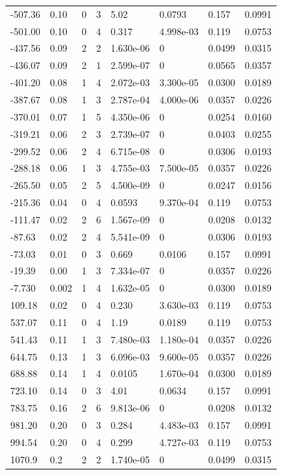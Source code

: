 \documentclass[preview]{standalone}
\begin{document}
{{\begin{tabular}{L{1.2cm}C{1.2cm} C{0.3cm}C{0.5cm} C{1.4cm}C{1.4cm} C{1.4cm}C{1.4cm}}
  -507.36  &  0.10  & 0     &  3 &  5.02  & 0.0793  & 0.157 &  0.0991   \\ 
  -501.00  &  0.10  & 0     &  4 &  0.317  & 4.998e-03  & 0.119 &  0.0753   \\ 
  -437.56  &  0.09  & 2     &  2 &  1.630e-06  & 0  & 0.0499 &  0.0315   \\ 
  -436.07  &  0.09  & 2     &  1 &  2.599e-07  & 0  & 0.0565 &  0.0357   \\ 
  -401.20  &  0.08  & 1     &  4 &  2.072e-03  & 3.300e-05  & 0.0300 &  0.0189   \\ 
  -387.67  &  0.08  & 1     &  3 &  2.787e-04  & 4.000e-06  & 0.0357 &  0.0226   \\ 
  -370.01  &  0.07  & 1     &  5 &  4.350e-06  & 0  & 0.0254 &  0.0160   \\ 
  -319.21  &  0.06  & 2     &  3 &  2.739e-07  & 0  & 0.0403 &  0.0255   \\ 
  -299.52  &  0.06  & 2     &  4 &  6.715e-08  & 0  & 0.0306 &  0.0193   \\ 
  -288.18  &  0.06  & 1     &  3 &  4.755e-03  & 7.500e-05  & 0.0357 &  0.0226   \\ 
  -265.50  &  0.05  & 2     &  5 &  4.500e-09  & 0  & 0.0247 &  0.0156   \\ 
  -215.36  &  0.04  & 0     &  4 &  0.0593  & 9.370e-04  & 0.119 &  0.0753   \\ 
  -111.47  &  0.02  & 2     &  6 &  1.567e-09  & 0  & 0.0208 &  0.0132   \\ 
  -87.63  &  0.02  & 2     &  4 &  5.541e-09  & 0  & 0.0306 &  0.0193   \\ 
  -73.03  &  0.01  & 0     &  3 &  0.669  & 0.0106  & 0.157 &  0.0991   \\ 
  -19.39  &  0.00  & 1     &  3 &  7.334e-07  & 0  & 0.0357 &  0.0226   \\ 
  -7.730  &  0.002  & 1     &  4 &  1.632e-05  & 0  & 0.0300 &  0.0189   \\ 
  109.18  &  0.02  & 0     &  4 &  0.230  & 3.630e-03  & 0.119 &  0.0753   \\ 
  537.07  &  0.11  & 0     &  4 &  1.19  & 0.0189  & 0.119 &  0.0753   \\ 
  541.43  &  0.11  & 1     &  3 &  7.480e-03  & 1.180e-04  & 0.0357 &  0.0226   \\ 
  644.75  &  0.13  & 1     &  3 &  6.096e-03  & 9.600e-05  & 0.0357 &  0.0226   \\ 
  688.88  &  0.14  & 1     &  4 &  0.0105  & 1.670e-04  & 0.0300 &  0.0189   \\ 
  723.10  &  0.14  & 0     &  3 &  4.01  & 0.0634  & 0.157 &  0.0991   \\ 
  783.75  &  0.16  & 2     &  6 &  9.813e-06  & 0  & 0.0208 &  0.0132   \\ 
  981.20  &  0.20  & 0     &  3 &  0.284  & 4.483e-03  & 0.157 &  0.0991   \\ 
  994.54  &  0.20  & 0     &  4 &  0.299  & 4.727e-03  & 0.119 &  0.0753   \\ 
  1070.9  &   0.2  & 2     &  2 &  1.740e-05  & 0  & 0.0499 &  0.0315   \\ 
\hline 
\end{tabular} 

}}
\end{document}
